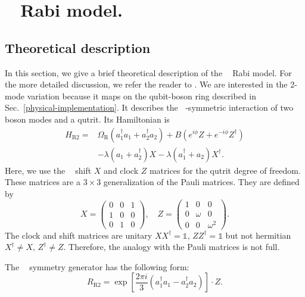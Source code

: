 \documentclass[reprint, aps, prx, amsmath, amssymb, longbibliography, superscriptaddress]{revtex4-2}
\DeclareMathOperator{\Zthree}{\mathbb{Z}_3}
\begin{document}
\section{$\Zthree$ Rabi model.}

\subsection{Theoretical description}
\label{sec:rabi-theory}

In this section, we give a brief theoretical description of the $\Zthree$ Rabi model. For the more detailed discussion, we refer the reader to . We are interested in the 2-mode variation because it maps on the qubit-boson ring described in Sec.~\ref{physical-implementation}. It describes the $\Zthree$-symmetric interaction of two boson modes and a qutrit. Its Hamiltonian is
\begin{equation}
\label{2-mode-z3-Rabi}
\begin{aligned}
     H_{\text{R}2} = &\Omega_{\text{R}} ( a_1^{\dagger}  a_1 +  a_2^{\dagger}  a_2) + B (e^{i\phi} Z + e^{-i\phi} Z^{\dagger}) \\
    &- \lambda ( a_1 +  a_2^{\dagger}) X - \lambda ( a_1^{\dagger} +  a_2) X^{\dagger}.
\end{aligned}
\end{equation}
Here, we use the $\Zthree$ shift $X$ and clock $Z$ matrices for the qutrit degree of freedom. These matrices are a $3\times 3$ generalization of the Pauli matrices. They are defined by
\begin{equation}
\label{shift-clock-matreces}
    X = \begin{pmatrix} 
         0 & 0 & 1 \\
         1 & 0 & 0 \\
         0 & 1 & 0 
        \end{pmatrix}, \quad
    Z = \begin{pmatrix}
         1 & 0 & 0 \\
         0 & \omega & 0 \\
         0 & 0 & \omega^2
        \end{pmatrix}.
      \end{equation}
The clock and shift matrices are unitary $ X X^{\dagger} = \mathbb{1}, \, Z Z^{\dagger} = \mathbb{1}$ but not hermitian $ X^{\dagger} \neq X, \, Z^{\dagger} \neq Z$. Therefore, the analogy with the Pauli matrices is not full.

The $\Zthree$ symmetry generator has the following form:
\begin{equation}
     R_{\text{R}2} = \exp\left[\frac{2\pi i}{3}(a_1^{\dagger}  a_1 -  a_2^{\dagger}  a_2)\right] \cdot Z.
   \end{equation}
   
\end{document}
